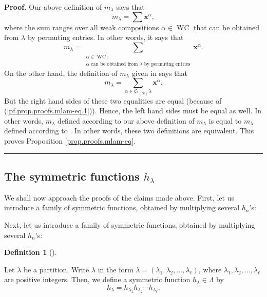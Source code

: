 \documentclass[numbers=enddot,12pt,final,onecolumn,notitlepage]{scrartcl}%
\theoremstyle{definition}
\newtheorem{defi}[theo]{Definition}
\newenvironment{definition}[1][]
{\begin{defi}[#1]\begin{leftbar}}
{\end{leftbar}\end{defi}}
\newenvironment{proof}[1][Proof]{\noindent\textbf{#1.} }{\ \rule{0.5em}{0.5em}}
\let\sumnonlimits\sum
\renewcommand{\sum}{\sumnonlimits\limits}
\newenvironment{verlong}{}{}
\newenvironment{vershort}{}{}
\begin{document}
\begin{verlong}
\begin{proof}
Our above definition of $m_{\lambda}$ says that%
\[
m_{\lambda}=\sum\mathbf{x}^{\alpha},
\]
where the sum ranges over all weak compositions $\alpha\in\operatorname*{WC}$
that can be obtained from $\lambda$ by permuting entries. In other words, it
says that%
\[
m_{\lambda}=\sum_{\substack{\alpha\in\operatorname*{WC};\\\alpha\text{ can be
obtained from }\lambda\text{ by permuting entries}}}\mathbf{x}^{\alpha}.
\]
On the other hand, the definition of $m_{\lambda}$ given in \cite[Definition
2.1.3]{GriRei} says that%
\begin{equation}
m_{\lambda}=\sum_{\alpha\in\mathfrak{S}_{\left(  \infty\right)  }\lambda
}\mathbf{x}^{\alpha}. \label{pf.prop.G.basics.b.1}%
\end{equation}
But the right hand sides of these two equalities are equal (because of
(\ref{pf.prop.proofs.mlam-eq.1})). Hence, the left hand sides must be equal as
well. In other words, $m_{\lambda}$ defined according to our above definition
of $m_{\lambda}$ is equal to $m_{\lambda}$ defined according to
\cite[Definition 2.1.3]{GriRei}. In other words, these two definitions are
equivalent. This proves Proposition \ref{prop.proofs.mlam-eq}.
\end{proof}
\end{verlong}

\subsection{The symmetric functions $h_{\lambda}$}

\begin{vershort}
We shall now approach the proofs of the claims made above. First, let us
introduce a family of symmetric functions, obtained by multiplying several
$h_{n}$'s:
\end{vershort}

\begin{verlong}
Next, let us introduce a family of symmetric functions, obtained by
multiplying several $h_{n}$'s:
\end{verlong}

\begin{definition}
\label{def.hlam}Let $\lambda$ be a partition. Write $\lambda$ in the form
$\lambda=\left(  \lambda_{1},\lambda_{2},\ldots,\lambda_{\ell}\right)  $,
where $\lambda_{1},\lambda_{2},\ldots,\lambda_{\ell}$ are positive integers.
Then, we define a symmetric function $h_{\lambda}\in\Lambda$ by%
\[
h_{\lambda}=h_{\lambda_{1}}h_{\lambda_{2}}\cdots h_{\lambda_{\ell}}.
\]

\end{definition}
\end{document}
